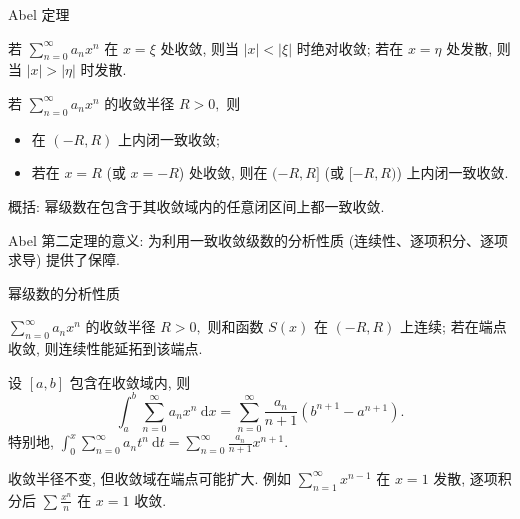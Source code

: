 
\begin{frame}{Abel 定理}

\begin{thm}
若 $\sum_{n=0}^\infty a_n x^n$ 在 $x = \xi$ 处收敛, 则当 $|x| < |\xi|$ 时绝对收敛; 若在 $x = \eta$ 处发散, 则当 $|x| > |\eta|$ 时发散.
\end{thm}

\pause

\begin{thm}
若 $\sum_{n=0}^\infty a_n x^n$ 的收敛半径 $R > 0,$ 则
\begin{itemize}
\item 在 $(-R, R)$ 上内闭一致收敛;
\pause
\item 若在 $x = R$ (或 $x = -R$) 处收敛, 则在 $(-R, R]$ (或 $[-R, R)$) 上内闭一致收敛.
\end{itemize}
\end{thm}

\pause
\vspace{0.5em}

{\color{red}概括}: 幂级数在包含于其收敛域内的任意闭区间上都一致收敛.

\pause
\vspace{0.5em}

{\color{red}Abel 第二定理的意义}: 为利用一致收敛级数的分析性质 (连续性、逐项积分、逐项求导) 提供了保障.

\end{frame}


\begin{frame}{幂级数的分析性质}

\begin{thm}[和函数的连续性]
$\sum_{n=0}^\infty a_n x^n$ 的收敛半径 $R > 0,$ 则和函数 $S(x)$ 在 $(-R, R)$ 上连续; 若在端点收敛, 则连续性能延拓到该端点.
\end{thm}

\pause

\begin{thm}[逐项可积性]
设 $[a, b]$ 包含在收敛域内, 则
\[\int_a^b \sum_{n=0}^\infty a_n x^n ~ \mathrm{d}x = \sum_{n=0}^\infty \frac{a_n}{n+1} (b^{n+1} - a^{n+1}).\]
特别地, $\int_0^x \sum_{n=0}^\infty a_n t^n ~ \mathrm{d}t = \sum_{n=0}^\infty \frac{a_n}{n+1} x^{n+1}.$
\end{thm}

\pause

{\color{red}收敛半径不变, 但收敛域在端点可能扩大.} 例如 $\sum_{n=1}^\infty x^{n-1}$ 在 $x=1$ 发散, 逐项积分后 $\sum \frac{x^n}{n}$ 在 $x=1$ 收敛.


\end{frame}

